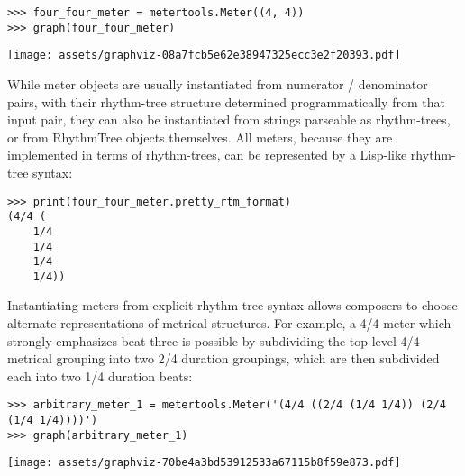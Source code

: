 \begin{singlespacing}
\vspace{-0.5\baselineskip}
\begin{lstlisting}
>>> four_four_meter = metertools.Meter((4, 4))
>>> graph(four_four_meter)
\end{lstlisting}
\noindent\texttt{[image: assets/graphviz-08a7fcb5e62e38947325ecc3e2f20393.pdf]}
\end{singlespacing}

\noindent While meter objects are usually instantiated from numerator /
denominator pairs, with their rhythm-tree structure determined programmatically
from that input pair, they can also be instantiated from strings parseable as
rhythm-trees, or from RhythmTree objects themselves. All meters, because they
are implemented in terms of rhythm-trees, can be represented by a Lisp-like
rhythm-tree syntax:

\begin{comment}
<abjad>
print(four_four_meter.pretty_rtm_format)
</abjad>
\end{comment}

\begin{singlespacing}
\vspace{-0.5\baselineskip}
\begin{lstlisting}
>>> print(four_four_meter.pretty_rtm_format)
(4/4 (
	1/4
	1/4
	1/4
	1/4))
\end{lstlisting}
\end{singlespacing}

Instantiating meters from explicit rhythm tree syntax allows composers to
choose alternate representations of metrical structures. For example, a 4/4
meter which strongly emphasizes beat three is possible by subdividing the
top-level 4/4 metrical grouping into two 2/4 duration groupings, which are then
subdivided each into two 1/4 duration beats:

\begin{comment}
<abjad>
arbitrary_meter_1 = metertools.Meter('(4/4 ((2/4 (1/4 1/4)) (2/4 (1/4 1/4))))')
graph(arbitrary_meter_1)
</abjad>
\end{comment}

\begin{singlespacing}
\vspace{-0.5\baselineskip}
\begin{lstlisting}
>>> arbitrary_meter_1 = metertools.Meter('(4/4 ((2/4 (1/4 1/4)) (2/4 (1/4 1/4))))')
>>> graph(arbitrary_meter_1)
\end{lstlisting}
\noindent\texttt{[image: assets/graphviz-70be4a3bd53912533a67115b8f59e873.pdf]}
\end{singlespacing}

